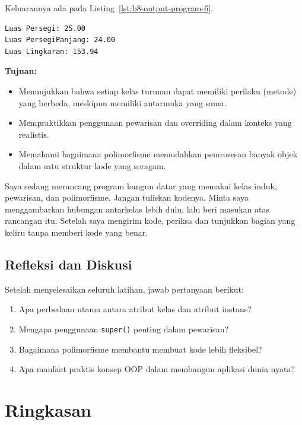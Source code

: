 Keluarannya ada pada Listing~\ref{lst:b8-output-program-6}.

\begin{lstlisting}[language=bash, caption={Output Program}, label={lst:b8-output-program-6}]
Luas Persegi: 25.00
Luas PersegiPanjang: 24.00
Luas Lingkaran: 153.94
\end{lstlisting}

\textbf{Tujuan:}
\begin{itemize}
    \item Menunjukkan bahwa setiap kelas turunan dapat memiliki perilaku (metode) yang berbeda, meskipun memiliki antarmuka yang sama.
    \item Mempraktikkan penggunaan pewarisan dan overriding dalam konteks yang realistis.
    \item Memahami bagaimana polimorfisme memudahkan pemrosesan banyak objek dalam satu struktur kode yang seragam.
\end{itemize}

\begin{promptterarah}
Saya sedang merancang program bangun datar yang memakai kelas induk, pewarisan, dan polimorfisme. Jangan tuliskan kodenya. Minta saya menggambarkan hubungan antarkelas lebih dulu, lalu beri masukan atas rancangan itu. Setelah saya mengirim kode, periksa dan tunjukkan bagian yang keliru tanpa memberi kode yang benar.
\end{promptterarah}


\subsection*{Refleksi dan Diskusi}
Setelah menyelesaikan seluruh latihan, jawab pertanyaan berikut:
\begin{enumerate}
    \item Apa perbedaan utama antara atribut kelas dan atribut instans?
    \item Mengapa penggunaan \texttt{super()} penting dalam pewarisan?
    \item Bagaimana polimorfisme membantu membuat kode lebih fleksibel?
    \item Apa manfaat praktis konsep OOP dalam membangun aplikasi dunia nyata?
\end{enumerate}

\section{Ringkasan}
	
